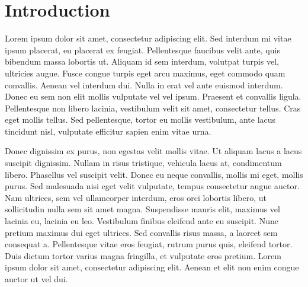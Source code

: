 \chapter{Introduction}
Lorem ipsum dolor sit amet, consectetur adipiscing elit. Sed interdum mi vitae ipsum placerat, eu placerat ex feugiat. Pellentesque faucibus velit ante, quis bibendum massa lobortis ut. Aliquam id sem interdum, volutpat turpis vel, ultricies augue. Fusce congue turpis eget arcu maximus, eget commodo quam convallis. Aenean vel interdum dui. Nulla in erat vel ante euismod interdum. Donec eu sem non elit mollis vulputate vel vel ipsum. Praesent et convallis ligula. Pellentesque non libero lacinia, vestibulum velit sit amet, consectetur tellus. Cras eget mollis tellus. Sed pellentesque, tortor eu mollis vestibulum, ante lacus tincidunt nisl, vulputate efficitur sapien enim vitae urna.\cite{CiteExample}

Donec dignissim ex purus, non egestas velit mollis vitae. Ut aliquam lacus a lacus suscipit dignissim. Nullam in risus tristique, vehicula lacus at, condimentum libero. Phasellus vel suscipit velit. Donec eu neque convallis, mollis mi eget, mollis purus. Sed malesuada nisi eget velit vulputate, tempus consectetur augue auctor. Nam ultrices, sem vel ullamcorper interdum, eros orci lobortis libero, ut sollicitudin nulla sem sit amet magna. Suspendisse mauris elit, maximus vel lacinia eu, lacinia eu leo. Vestibulum finibus eleifend ante eu suscipit. Nunc pretium maximus dui eget ultrices. Sed convallis risus massa, a laoreet sem consequat a. Pellentesque vitae eros feugiat, rutrum purus quis, eleifend tortor. Duis dictum tortor varius magna fringilla, et vulputate eros pretium. Lorem ipsum dolor sit amet, consectetur adipiscing elit. Aenean et elit non enim congue auctor ut vel dui.

